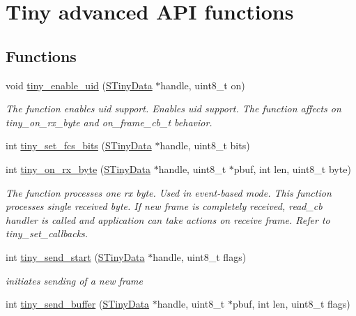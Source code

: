 \hypertarget{group__ADVANCED__API}{}\section{Tiny advanced A\+PI functions}
\label{group__ADVANCED__API}
\subsection*{Functions}
\begin{DoxyCompactItemize}
\item 
void \hyperlink{group__ADVANCED__API_gac5cabf56a5b22e96036b9e5bff926f1d}{tiny\+\_\+enable\+\_\+uid} (\hyperlink{structSTinyData}{S\+Tiny\+Data} $\ast$handle, uint8\+\_\+t on)
\begin{DoxyCompactList}\small\item\em The function enables uid support. Enables uid support. The function affects on tiny\+\_\+on\+\_\+rx\+\_\+byte and on\+\_\+frame\+\_\+cb\+\_\+t behavior. \end{DoxyCompactList}\item 
int \hyperlink{group__ADVANCED__API_ga5e66725a2818491d4e2b1134951d9229}{tiny\+\_\+set\+\_\+fcs\+\_\+bits} (\hyperlink{structSTinyData}{S\+Tiny\+Data} $\ast$handle, uint8\+\_\+t bits)
\item 
int \hyperlink{group__ADVANCED__API_gaaf9bf6423bd0b8388c3387225b805278}{tiny\+\_\+on\+\_\+rx\+\_\+byte} (\hyperlink{structSTinyData}{S\+Tiny\+Data} $\ast$handle, uint8\+\_\+t $\ast$pbuf, int len, uint8\+\_\+t byte)
\begin{DoxyCompactList}\small\item\em The function processes one rx byte. Used in event-\/based mode. This function processes single received byte. If new frame is completely received, read\+\_\+cb handler is called and application can take actions on receive frame. Refer to tiny\+\_\+set\+\_\+callbacks. \end{DoxyCompactList}\item 
int \hyperlink{group__ADVANCED__API_ga159189fa29f3eaa79a76a3fa87b31084}{tiny\+\_\+send\+\_\+start} (\hyperlink{structSTinyData}{S\+Tiny\+Data} $\ast$handle, uint8\+\_\+t flags)
\begin{DoxyCompactList}\small\item\em initiates sending of a new frame \end{DoxyCompactList}\item 
int \hyperlink{group__ADVANCED__API_gabe04a4e76adc5421deac4e3699a15646}{tiny\+\_\+send\+\_\+buffer} (\hyperlink{structSTinyData}{S\+Tiny\+Data} $\ast$handle, uint8\+\_\+t $\ast$pbuf, int len, uint8\+\_\+t flags)

\end{DoxyCompactItemize}
